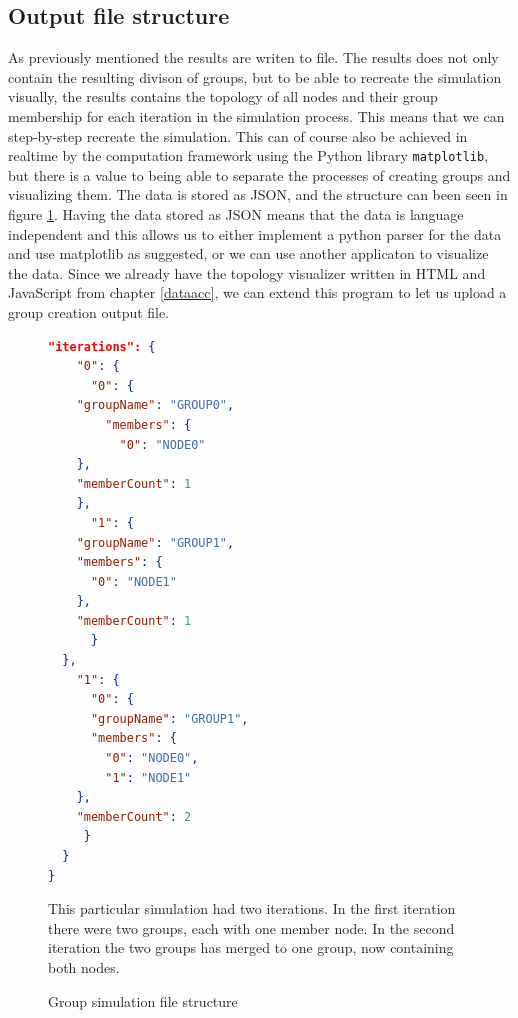 \subsection{Output file structure}
As previously mentioned the results are writen to file. The results does not only contain the resulting divison of groups, but to be able to recreate the simulation
visually, the results contains the topology of all nodes and their group membership for each iteration in the simulation process. This means that we can step-by-step
recreate the simulation. This can of course also be achieved in realtime by the computation framework using the Python library \verb|matplotlib|, but
there is a value to being able to separate the processes of creating groups and visualizing them. The data is stored as JSON, and the structure can been seen in
figure \ref{fig:jsongroup}. Having the data stored as JSON means that the data is language independent and this allows us to either implement a
python parser for the data and use matplotlib as suggested, or we can use another applicaton to visualize the data. Since we already have the topology visualizer
written in HTML and JavaScript from chapter \ref{dataacc}, we can extend this program to let us upload a group creation output file. 
\begin{figure}[H]
\begin{minipage}{\linewidth}
\begin{lstlisting}[language=json]
  "iterations": {
    "0": {
      "0": {
	"groupName": "GROUP0",
        "members": {
          "0": "NODE0"
	},
	"memberCount": 1
    },
      "1": {
	"groupName": "GROUP1",
	"members": {
	  "0": "NODE1"
	},
	"memberCount": 1
      }
  },
    "1": {
      "0": {
	  "groupName": "GROUP1",
	  "members": {
	    "0": "NODE0",
	    "1": "NODE1"
	},
	"memberCount": 2
     }
  }
}
\end{lstlisting}
\end{minipage}

\caption{Group simulation file structure}
\medskip
\small
This particular simulation had two iterations. In the first iteration there were two groups, each with one member node. In the second iteration the two groups has merged to one group, now
containing both nodes. 
\label{fig:jsongroup}
\end{figure}




